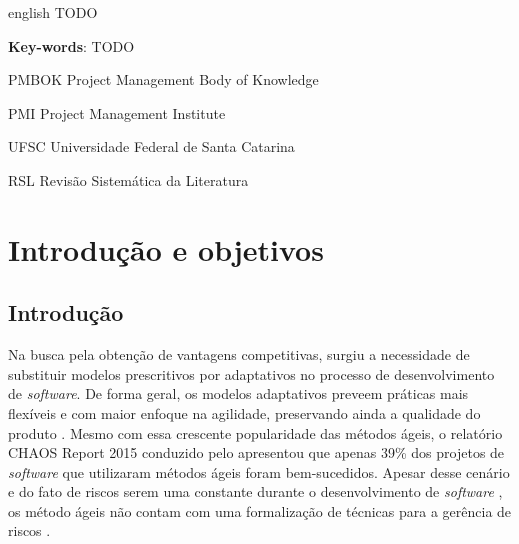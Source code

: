 \documentclass[
    12pt,       %
    openright,      %
    twoside,      %
    a4paper,      %
    english,      %
    french,       %
    spanish,      %
    brazil,       %
    ]{abntex2}
\begin{document}
  \begin{resumo}[Abstract]
   \begin{otherlanguage*}{english}
TODO
     \vspace{\onelineskip}

     \noindent
     \textbf{Key-words}: TODO
   \end{otherlanguage*}
  \end{resumo}

  \listoffigures*
  \cleardoublepage

  \listoftables*
  \cleardoublepage

  \begin{siglas}
    \item[PMBOK] Project Management Body of Knowledge
    \item[PMI]  Project Management Institute
    \item[UFSC] Universidade Federal de Santa Catarina
    \item[RSL] Revisão Sistemática da Literatura
 \end{siglas}

  \tableofcontents*
  \cleardoublepage



  \textual


\chapter{Introdução e objetivos}
\label{sec:Introducao}
\section{Introdução}

Na busca pela obtenção de vantagens competitivas, surgiu a necessidade de substituir modelos prescritivos por adaptativos no processo de desenvolvimento de \textit{software}. De forma geral, os modelos adaptativos preveem práticas mais flexíveis e com maior enfoque na agilidade, preservando ainda a qualidade do produto \cite{Rech:2013}. Mesmo com essa crescente popularidade das métodos ágeis, o relatório CHAOS Report 2015 conduzido pelo   apresentou que apenas 39\% dos projetos de \textit{software} que utilizaram métodos ágeis foram bem-sucedidos. Apesar desse cenário e do fato de riscos serem uma constante durante o desenvolvimento de \textit{software} \cite{Cunha:2013}, os método ágeis não contam com uma formalização de técnicas para a gerência de riscos \cite{Tomanek:2015}.
\end{document}
